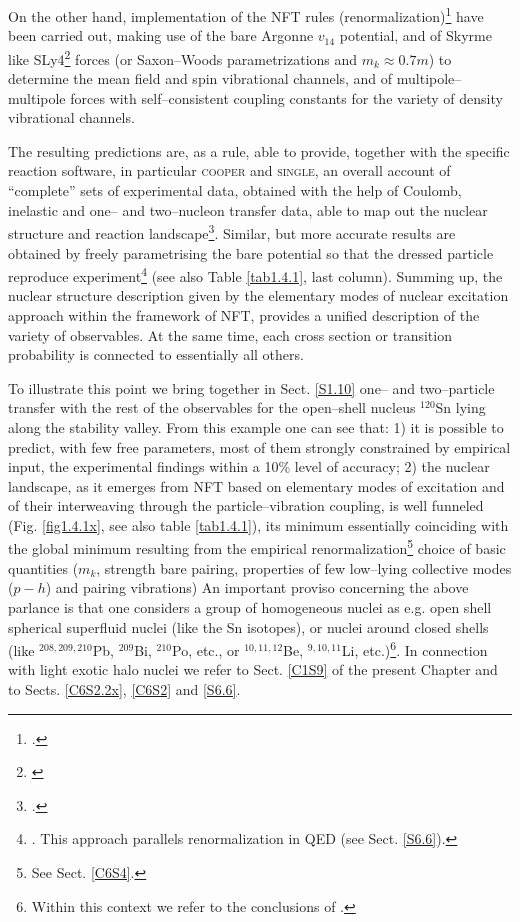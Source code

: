On the other hand,  implementation of the NFT rules (renormalization)\footnote{\cite{Broglia:16}.} have been carried out, making use of the bare Argonne $v_{14}$ potential, and of Skyrme like SLy4\footnote{\cite{Chabanat:97}} forces (or Saxon--Woods parametrizations and $m_k\approx0.7 m$) to determine the mean field and spin vibrational channels, and of multipole--multipole forces with self--consistent  coupling constants for the variety of density vibrational channels.


The resulting predictions are, as a rule, able to provide, together with the specific reaction software, in particular \textsc{cooper} and \textsc{single}, an overall account of ``complete'' sets of experimental data, obtained with the help of Coulomb, inelastic and one-- and two--nucleon transfer data, able to map out the nuclear structure and reaction landscape\footnote{\cite{Idini:15,Idini:14,Potel:13}.}. Similar, but more accurate results are obtained by freely parametrising the bare potential so that the dressed particle reproduce experiment\footnote{\cite{Barranco:17}. This approach parallels renormalization in QED (see Sect. \ref{S6.6}).} (see also Table \ref{tab1.4.1}, last column).  Summing up, the nuclear structure description given by the elementary modes of nuclear excitation approach within the framework of NFT, provides a unified description of the variety of observables. At the same time, each cross section or transition probability is connected to essentially all others.


To illustrate this point we  bring together  in Sect. \ref{S1.10} one-- and two--particle transfer with the rest of the observables  for the open--shell nucleus $^{120}$Sn lying  along the stability valley. From this example one can see that: 1) it is possible to predict, with few free parameters, most of them strongly constrained by empirical input, the experimental findings within a 10\% level of accuracy; 2) the nuclear landscape, as it emerges from NFT based on elementary modes of excitation and of their interweaving through the particle--vibration coupling, is well funneled (Fig. \ref{fig1.4.1x}, see also table \ref{tab1.4.1}), its minimum essentially coinciding with the global minimum resulting from the empirical renormalization\footnote{See Sect. \ref{C6S4}.} choice of basic quantities ($m_k$, strength bare pairing, properties of few low--lying collective modes ($p-h$) and pairing vibrations) An important proviso concerning the above parlance is that one considers a group of homogeneous nuclei as e.g. open shell spherical superfluid nuclei (like the Sn isotopes), or nuclei around closed shells (like $^{208,209,210}$Pb, $^{209}$Bi, $^{210}$Po, etc., or $^{10,11,12}$Be, $^{9,10,11}$Li, etc.)\footnote{Within this context we refer to the conclusions of \cite{Idini:15}.}. In connection with light exotic halo nuclei we refer to Sect. \ref{C1S9} of the present Chapter and to Sects. \ref{C6S2.2x},  \ref{C6S2} and \ref{S6.6}.




